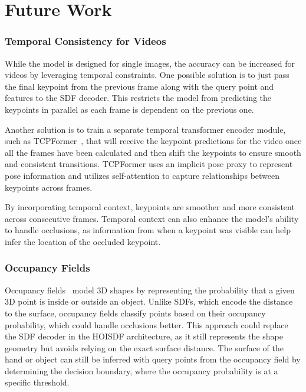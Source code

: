 \documentclass{article}
\begin{document}
\section*{Future Work}

\subsubsection*{Temporal Consistency for Videos}

While the model is designed for single images, the accuracy can be increased for videos by leveraging temporal constraints. One possible solution is to just pass the final keypoint from the previous frame along with the query point and features to the SDF decoder. This restricts the model from predicting the keypoints in parallel as each frame is dependent on the previous one.

Another solution is to train a separate temporal transformer encoder module, such as TCPFormer~\cite{liu2025tcpformer}, that will receive the keypoint predictions for the video once all the frames have been calculated and then shift the keypoints to ensure smooth and consistent transitions. TCPFormer uses an implicit pose proxy to represent pose information and utilizes self-attention to capture relationships between keypoints across frames.

By incorporating temporal context, keypoints are smoother and more consistent across consecutive frames. Temporal context can also enhance the model's ability to handle occlusions, as information from when a keypoint was visible can help infer the location of the occluded keypoint.

\subsubsection*{Occupancy Fields}

Occupancy fields~\cite{li2024diffusionfof} model 3D shapes by representing the probability that a given 3D point is inside or outside an object. Unlike SDFs, which encode the distance to the surface, occupancy fields classify points based on their occupancy probability, which could handle occlusions better. This approach could replace the SDF decoder in the HOISDF architecture, as it still represents the shape geometry but avoids relying on the exact surface distance. The surface of the hand or object can still be inferred with query points from the occupancy field by determining the decision boundary, where the occupancy probability is at a specific threshold.

\printbibliography[]
\end{document}
